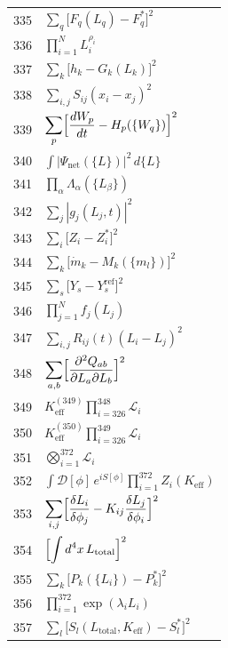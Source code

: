 \documentclass[12pt,a4paper]{article}
\begin{document}
\begin{longtable}{r p{}}
	335 & \(\displaystyle \sum_q\bigl[F_q(L_q) - F_q^*\bigr]^2\) \\
	336 & \(\displaystyle \prod_{i=1}^N L_i^{\rho_i}\) \\
	337 & \(\displaystyle \sum_k\bigl[h_k - G_k(L_k)\bigr]^2\) \\
	338 & \(\displaystyle \sum_{i,j}S_{ij}(x_i - x_j)^2\) \\
	339 & \(\displaystyle \sum_p\Bigl[\frac{dW_p}{dt} - H_p(\{W_q\})\Bigr]^2\) \\
	340 & \(\displaystyle \int|\Psi_{\text{net}}(\{L\})|^2\,d\{L\}\) \\
	341 & \(\displaystyle \prod_\alpha\Lambda_\alpha(\{L_\beta\})\) \\
	342 & \(\displaystyle \sum_j|g_j(L_j,t)|^2\) \\
	343 & \(\displaystyle \sum_i\bigl[Z_i - Z_i^*\bigr]^2\) \\
	344 & \(\displaystyle \sum_k\bigl[\dot m_k - M_k(\{m_l\})\bigr]^2\) \\
	345 & \(\displaystyle \sum_s\bigl[Y_s - Y_s^{\text{ref}}\bigr]^2\) \\
	346 & \(\displaystyle \prod_{j=1}^N f_j(L_j)\) \\
	347 & \(\displaystyle \sum_{i,j}R_{ij}(t)(L_i - L_j)^2\) \\
	348 & \(\displaystyle \sum_{a,b}\Bigl[\frac{\partial^2 Q_{ab}}{\partial L_a\partial L_b}\Bigr]^2\) \\
	349 & \(\displaystyle K^{(349)}_{\mathrm{eff}}\prod_{i=326}^{348}\mathcal{L}_i\) \\
	350 & \(\displaystyle K^{(350)}_{\mathrm{eff}}\prod_{i=326}^{349}\mathcal{L}_i\) \\
	351 & \(\displaystyle \bigotimes_{i=1}^{372}\mathcal{L}_i\) \\
	352 & \(\displaystyle \int\mathcal{D}[\phi]\,e^{iS[\phi]}\prod_{i=1}^{372}Z_i(K_{\mathrm{eff}})\) \\
	353 & \(\displaystyle \sum_{i,j}\Bigl[\frac{\delta L_i}{\delta\phi_j} - K_{ij}\frac{\delta L_j}{\delta\phi_i}\Bigr]^2\) \\
	354 & \(\displaystyle \Bigl[\int d^4x\,L_{\text{total}}\Bigr]^2\) \\
	355 & \(\displaystyle \sum_k\bigl[P_k(\{L_i\}) - P_k^*\bigr]^2\) \\
	356 & \(\displaystyle \prod_{i=1}^{372}\exp(\lambda_i L_i)\) \\
	357 & \(\displaystyle \sum_l\bigl[S_l(L_{\text{total}},K_{\mathrm{eff}}) - S_l^*\bigr]^2\) \\

\end{longtable}
\end{document}
